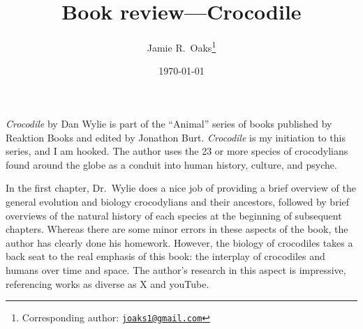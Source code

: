 \documentclass[letterpaper,12pt]{article}
\title{Book review---Crocodile}
\author[1]{Jamie R.\ Oaks\thanks{Corresponding author: \href{mailto:joaks1@gmail.com}{\tt joaks1@gmail.com}}}
\affil[1]{Department of Biology, University of Washington, Seattle, Washington 98195}
\date{\today}
\newcommand{\croc}{\emph{Crocodile}\xspace}
\begin{document}
\maketitle

\newpage
\doublespacing

\croc by Dan Wylie \citep{Wylie2013} is part of the ``Animal'' series of books
published by Reaktion Books and edited by Jonathon Burt.
\croc is my initiation to this series, and I am hooked.
The author uses the 23 or more species of crocodylians found around the globe
as a conduit into human history, culture, and psyche.

In the first chapter, Dr.\ Wylie does a nice job of providing a brief overview
of the general evolution and biology crocodylians and their ancestors, followed
by brief overviews of the natural history of each species at the beginning of
subsequent chapters.
Whereas there are some minor errors in these aspects of the book, the
author has clearly done his homework.
However, the biology of crocodiles takes a back seat to the real emphasis of
this book: the interplay of crocodiles and humans over time and space.
The author's research in this aspect is impressive, referencing works as
diverse as X and youTube.



\end{document}
